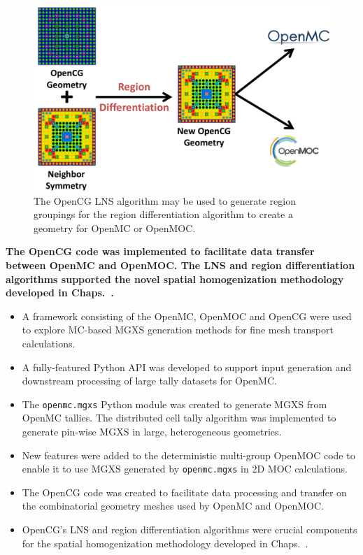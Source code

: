 \begin{figure}[h!]
  \centering
  \includegraphics[width=0.8\linewidth]{figures/workflow/opencg/region-diff-proc-diagram}
  \caption[OpenCG region differentiation process diagram]{The OpenCG \ac{LNS} algorithm may be used to generate region groupings for the region differentiation algorithm to create a geometry for OpenMC or OpenMOC.}
  \label{fig:region-diff-proc-diagram}
\end{figure}

\begin{emphbox}
\textbf{The OpenCG code was implemented to facilitate data transfer between OpenMC and OpenMOC. The \ac{LNS} and region differentiation algorithms supported the novel spatial homogenization methodology developed in Chaps.~.}
\end{emphbox}


\vfill
\begin{highlightsbox}[frametitle=Highlights]
\begin{itemize}
  \item A framework consisting of the OpenMC, OpenMOC and OpenCG were used to explore \ac{MC}-based \ac{MGXS} generation methods for fine mesh transport calculations.
  \item A fully-featured Python \ac{API} was developed to support input generation and downstream processing of large tally datasets for OpenMC.
  \item The \texttt{openmc.mgxs} Python module was created to generate \ac{MGXS} from OpenMC tallies. The distributed cell tally algorithm was implemented to generate pin-wise \ac{MGXS} in large, heterogeneous geometries.
  \item New features were added to the deterministic multi-group OpenMOC code to enable it to use \ac{MGXS} generated by \texttt{openmc.mgxs} in 2D \ac{MOC} calculations.
  \item The OpenCG code was created to facilitate data processing and transfer on the combinatorial geometry meshes used by OpenMC and OpenMOC.
  \item OpenCG's \ac{LNS} and region differentiation algorithms were crucial components for the spatial homogenization methodology developed in Chaps.~.  
\end{itemize}
\end{highlightsbox}
\vfill